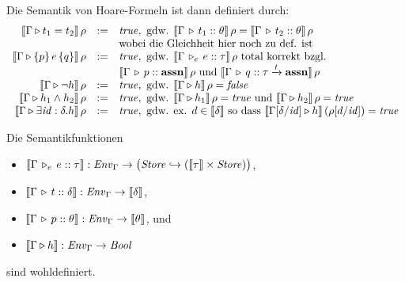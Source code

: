 \documentclass[12pt,a4paper,bigheadings]{scrartcl}
\newcommand{\semantic}[1]{\ensuremath{\llbracket#1\rrbracket}}
\newcommand{\assn}{\ensuremath{\mathbf{assn}}}
\newcommand{\tto}{\ensuremath{\xrightarrow{t}}}
\newcommand{\Tje}[3]{#1 \,\tr_e\, #2\cc#3}
\begin{document}
\noindent
Die Semantik von Hoare-Formeln ist dann definiert durch:
\[\begin{array}{rcl}
  \semantic{\Tjh{\Gamma}{t_1 = t_2}}\,\rho
  & := &
  \true, \text{ gdw. } \semantic{\Tj{\Gamma}{t_1}{\theta}}\,\rho = \semantic{\Tj{\Gamma}{t_2}{\theta}}\,\rho \\
  && \text{wobei die Gleichheit hier noch zu def. ist}
  \\
  \semantic{\Tjh{\Gamma}{\triple{p}{e}{q}}}\,\rho 
  & := &
  \true, \text{ gdw. } \semantic{\Tje{\Gamma}{e}{\tau}}\,\rho \text{ total korrekt bzgl. } \\
  && \semantic{\Tj{\Gamma}{p}{\assn}}\,\rho \text{ und } \semantic{\Tj{\Gamma}{q}{\tau \tto \assn}}\,\rho
  \\
  \semantic{\Tjh{\Gamma}{\neg h}}\,\rho
  & := &
  \true, \text{ gdw. } \semantic{\Tjh{\Gamma}{h}}\,\rho = \false
  \\
  \semantic{\Tjh{\Gamma}{h_1 \wedge h_2}}\,\rho
  & := &
  \true, \text{ gdw. } \semantic{\Tjh{\Gamma}{h_1}}\,\rho = \true \text{ und }
  \semantic{\Tjh{\Gamma}{h_2}}\,\rho = \true
  \\
  \semantic{\Tjh{\Gamma}{\exists \id:\delta.h}}\,\rho
  & := &
  \true, \text{ gdw. ex. } d \in \semantic{\delta} \text{ so dass }
  \semantic{\Tjh{\Gamma[\delta/\id]}{h}}\,(\rho[d/\id])=\true
\end{array}\]

\begin{satz}
  Die Semantikfunktionen
  \begin{itemize}
    \item $\semantic{\Tje{\Gamma}{e}{\tau}} : \Env_\Gamma \to\bigl( \Store \pto (\semantic{\tau}\times\Store) \bigr)$,
    \item $\semantic{\Tj{\Gamma}{t}{\delta}} : \Env_\Gamma \to \semantic{\delta}$,
    \item $\semantic{\Tj{\Gamma}{p}{\theta}} : \Env_\Gamma \to \semantic{\theta}$, und
    \item $\semantic{\Tjh{\Gamma}{h}} : \Env_\Gamma \to \Bool$
  \end{itemize}
  sind wohldefiniert.
\end{satz}
\end{document}
